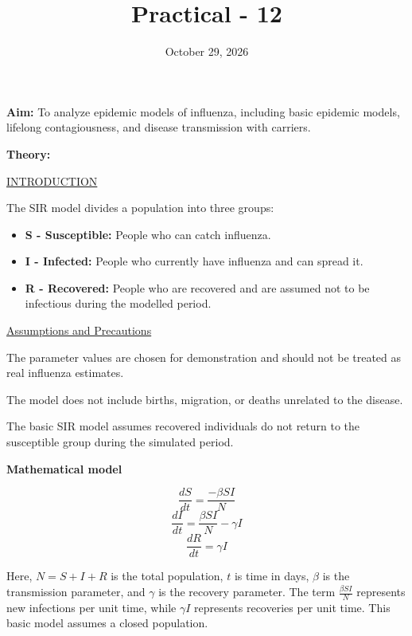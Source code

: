 \documentclass{article}
\title{\textbf{Practical - 12}}
\author{}
\date{October 29, 2026}
\begin{document}
\maketitle

\noindent
\textbf{\large{Aim:}} To analyze epidemic models of influenza, including basic epidemic models, lifelong contagiousness, and disease transmission with carriers.

\vspace{1em}
\noindent
\textbf{\large{Theory:}}

\vspace{0.5em}
\noindent
\underline{INTRODUCTION}

\noindent
The SIR model divides a population into three groups:
\begin{itemize}
    \item \textbf{S - Susceptible:} People who can catch influenza.
    \item \textbf{I - Infected:} People who currently have influenza and can spread it.
    \item \textbf{R - Recovered:} People who are recovered and are assumed not to be infectious during the modelled period.
\end{itemize}

\vspace{0.5em}
\noindent
\underline{Assumptions and Precautions}

\noindent
The parameter values are chosen for demonstration and should not be treated as real influenza estimates.

\noindent
The model does not include births, migration, or deaths unrelated to the disease.

\noindent
The basic SIR model assumes recovered individuals do not return to the susceptible group during the simulated period.

\vspace{1.5em}
\noindent
\textbf{Mathematical model}

    \[\frac{dS}{dt} = \frac{-\beta S I}{N}\]
    \[\frac{dI}{dt} = \frac{\beta S I}{N} - \gamma I\]
    \[\frac{dR}{dt} = \gamma I\]

\noindent
Here, $N = S + I + R$ is the total population, $t$ is time in days, $\beta$ is the transmission parameter, and $\gamma$ is the recovery parameter. The term $\frac{\beta S I}{N}$ represents new infections per unit time, while $\gamma I$ represents recoveries per unit time. This basic model assumes a closed population.
\end{document}
